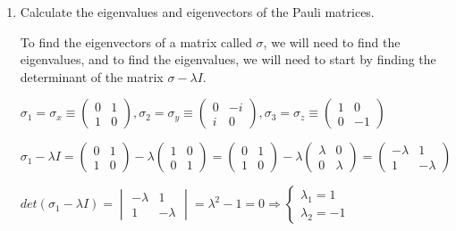 \documentclass[fleqn]{article}
\begin{document}
  \begin{enumerate}
    \item Calculate the eigenvalues and eigenvectors of the Pauli matrices.

      \textcolor{hwColor}{ 
        To find the eigenvectors of a matrix called $\sigma$, we will need to find the eigenvalues, and to find the eigenvalues, we will need to start by finding the determinant of the matrix $\sigma-\lambda I$.
      }

      \textcolor{hwColor}{ 
        $\sigma_1=\sigma_x\equiv
        \begin{pmatrix}
          0 & 1 \\
          1 & 0 
        \end{pmatrix}
         , \sigma_2=\sigma_y\equiv
        \begin{pmatrix}
          0 & -i \\
          i & 0 
        \end{pmatrix}
        , \sigma_3=\sigma_z\equiv
        \begin{pmatrix}
          1 & 0 \\
          0 & -1 
        \end{pmatrix}
        $
      }

      \bigbreak

      \textcolor{hwColor}{ 
        $\sigma_1-\lambda I=
          \begin{pmatrix}
            0 & 1 \\
            1 & 0 
          \end{pmatrix}-
          \lambda \begin{pmatrix}
            1 & 0 \\
            0 & 1
          \end{pmatrix}=
          \begin{pmatrix}
            0 & 1 \\
            1 & 0 
          \end{pmatrix}-
          \lambda \begin{pmatrix}
            \lambda & 0 \\
            0 & \lambda
          \end{pmatrix}=
          \begin{pmatrix}
            -\lambda & 1 \\
            1 & -\lambda
          \end{pmatrix}
        $
      }

      \textcolor{hwColor}{ 
        $det(\sigma_1-\lambda I)=
          \begin{vmatrix}
            -\lambda & 1 \\
            1 & -\lambda
          \end{vmatrix}= \lambda^2-1=0 
          \Longrightarrow
          \begin{cases}
            \lambda_1=1 \\
            \lambda_2=-1
          \end{cases}
        $
      }


\end{enumerate}
\end{document}
